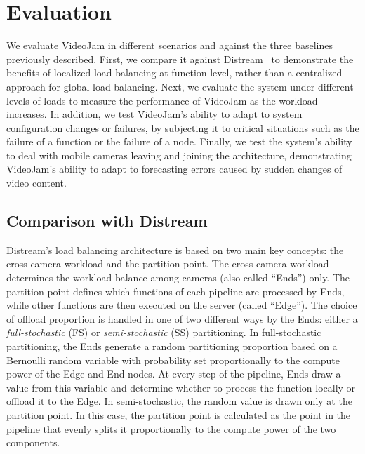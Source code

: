 \section{Evaluation}\label{sec:evaluation}

We evaluate VideoJam in different scenarios and against the three baselines previously described. First, we compare it against Distream~\cite{zeng2020distream} to demonstrate the benefits of localized load balancing at function level, rather than a centralized approach for global load balancing. Next, we evaluate the system under different levels of loads to measure the performance of VideoJam as the workload increases. In addition, we test VideoJam's ability to adapt to system configuration changes or failures, by subjecting it to critical situations such as the failure of a function or the failure of a node. Finally, we test the system's ability to deal with mobile cameras leaving and joining the architecture, demonstrating VideoJam's ability to adapt to forecasting errors caused by sudden changes of video content.

\subsection{Comparison with Distream}
Distream's load balancing architecture is based on two main key concepts: the cross-camera workload and the partition point. The cross-camera workload determines the workload balance among cameras (also called ``Ends'') only. The partition point defines which functions of each pipeline are processed by Ends, while other functions are then executed on the server (called ``Edge''). The choice of offload proportion is handled in one of two different ways by the Ends: either a \textit{full-stochastic} (FS) or \textit{semi-stochastic} (SS) partitioning. In full-stochastic partitioning, the Ends generate a random partitioning proportion based on a Bernoulli random variable with probability set proportionally to the compute power of the Edge and End nodes. At every step of the pipeline, Ends draw a value from this variable and determine whether to process the function locally or offload it to the Edge. In semi-stochastic, the random value is drawn only at the partition point. In this case, the partition point is calculated as the point in the pipeline that evenly splits it proportionally to the compute power of the two components. 

